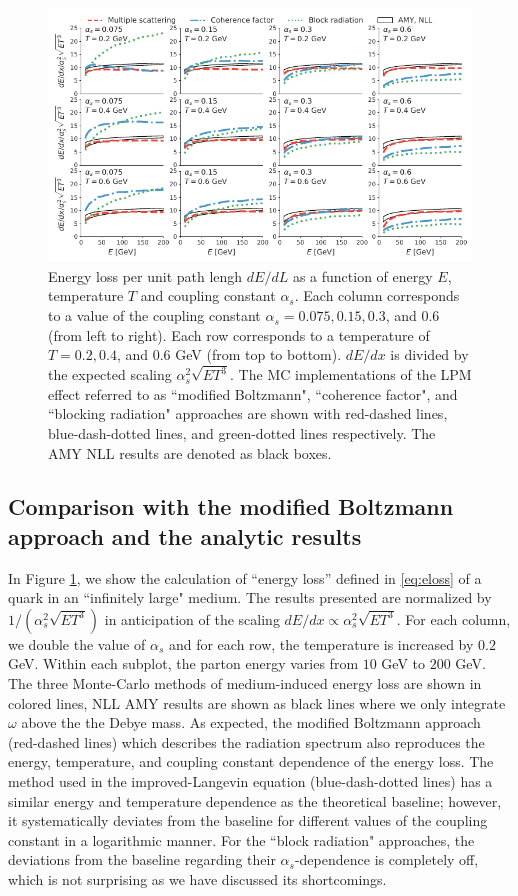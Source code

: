 \documentclass[aps, prc, reprint, amsmath, groupedaddress, nofootinbib]{revtex4-1}
\begin{document}
\begin{figure}
\centering
\includegraphics[width=1.\textwidth]{Eloss_infinite.pdf}
\caption{Energy loss per unit path lengh $dE/dL$ as a function of energy $E$, temperature $T$ and coupling constant $\alpha_s$. Each column corresponds to a value of the coupling constant $\alpha_s = 0.075, 0.15, 0.3$, and $0.6$ (from left to right). Each row corresponds to a temperature of $T = 0.2, 0.4$, and $0.6$ GeV (from top to bottom). $dE/dx$ is divided by the expected scaling $\alpha_s^2 \sqrt{ET^3}$. The MC implementations of the LPM effect referred to as ``modified Boltzmann", ``coherence factor", and ``blocking radiation" approaches are shown with red-dashed lines, blue-dash-dotted lines, and green-dotted lines respectively. The AMY NLL results are denoted as black boxes.}
\label{fig:eloss-inf}
\end{figure}


\subsection{Comparison with the modified Boltzmann approach and the analytic results}
In Figure \ref{fig:eloss-inf}, we show the calculation of ``energy loss'' defined in \ref{eq:eloss} of a quark in an ``infinitely large" medium. 
The results presented are normalized by $1/(\alpha_s^2 \sqrt{ET^3})$ in anticipation of the scaling $dE/dx \propto \alpha_s^2 \sqrt{ET^3}$.
For each column, we double the value of $\alpha_s$ and for each row, the temperature is increased by $0.2$ GeV. 
Within each subplot, the parton energy varies from $10$ GeV to $200$ GeV.
The three Monte-Carlo methods of medium-induced energy loss are shown in colored lines, 
NLL AMY results are shown as black lines where we only integrate $\omega$ above the the Debye mass.
As expected, the modified Boltzmann approach (red-dashed lines) which describes the radiation spectrum also reproduces the energy, temperature, and coupling constant dependence of the energy loss.
The method used in the improved-Langevin equation (blue-dash-dotted lines) has a similar energy and temperature dependence as the theoretical baseline; however, it systematically deviates from the baseline for different values of the coupling constant in a logarithmic manner.
For the ``block radiation" approaches, the deviations from the baseline regarding their $\alpha_s$-dependence is completely off, which is not surprising as we have discussed its shortcomings.
\end{document}
